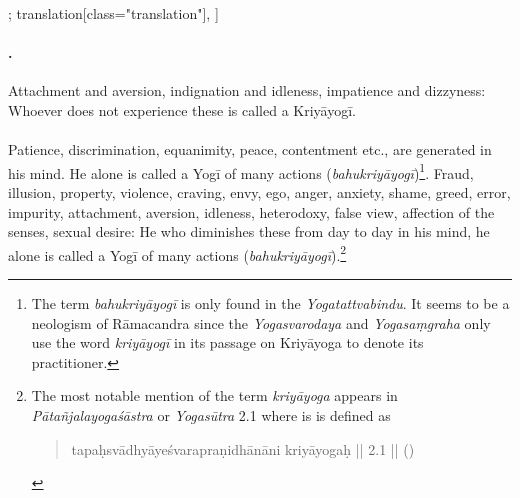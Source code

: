 \begin{alignment}[
    texts=edition[class="edition"];
    translation[class="translation"],
  ]
\begin{translation}
\begin{tlate}
\paragraph{\textsuperscript{}.} Attachment and aversion, indignation and idleness, impatience and dizzyness: Whoever does not experience these is called a Kriyāyogī.
\\\\
Patience, discrimination, equanimity, peace, contentment etc., are generated in his mind. He alone is called a Yogī of many actions (\textit{bahukriyāyogī})\footnote{The term \textit{bahukriyāyogī} is only found in the \textit{Yogatattvabindu}. It seems to be a neologism of Rāmacandra since the \textit{Yogasvarodaya} and \textit{Yogasaṃgraha} only use the word \textit{kriyāyogī} in its passage on Kriyāyoga to denote its practitioner.}. Fraud, illusion, property, violence, craving, envy, ego, anger, anxiety, shame, greed, error, impurity, attachment, aversion, idleness, heterodoxy, false view, affection of the senses, sexual desire: He who diminishes these from day to day in his mind, he alone is called a Yogī of many actions (\textit{bahukriyāyogī}).\textsuperscript{\coro{[\lowroman{10}]}}\footnote{The most notable mention of the term \textit{kriyāyoga} appears in \textit{Pātañjalayogaśāstra} or \textit{Yogasūtra} 2.1 where is is defined as  
\begin{quote}
tapaḥsvādhyāyeśvarapraṇidhānāni kriyāyogaḥ || 2.1 || (\citeauthor[1983:113]{yogasutra})
\end{quote}
}
\end{tlate}
\end{translation}
\end{alignment}
